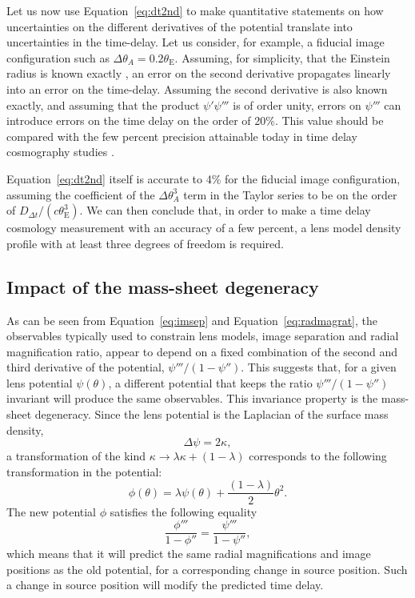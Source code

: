 \documentclass[usenatbib]{mnras}
\def\psii{\psi'}
\def\psiii{\psi''}
\def\psiiii{\psi'''}
\def\tein{\theta_{\mathrm{E}}}
\def\Eref#1{Equation~\ref{#1}\xspace}
\begin{document}
Let us now use \Eref{eq:dt2nd} to make quantitative statements on how uncertainties on the different derivatives of the potential translate into uncertainties in the time-delay.
Let us consider, for example, a fiducial image configuration such as $\Delta\theta_A = 0.2\tein$.
Assuming, for simplicity, that the Einstein radius is known exactly \citep[this is a good approximation, since $\tein$ is typically determined with better than 1\% precision in time-delay lens studies][]{Suy++14, Won++17}, an error on the second derivative propagates linearly into an error on the time-delay. Assuming the second derivative is also known exactly, and assuming that the product $\psii\psiiii$ is of order unity, errors on $\psiiii$ can introduce errors on the time delay on the order of 20\%.
This value should be compared with the few percent precision attainable today in time delay cosmography studies \citep{Suy++17}.

\Eref{eq:dt2nd} itself is accurate to 4\% for the fiducial image configuration, assuming the coefficient of the $\Delta\theta_A^3$ term in the Taylor series to be on the order of $D_{\Delta t}/(c\tein^3)$.
We can then conclude that, in order to make a time delay cosmology measurement with an accuracy of a few percent, a lens model density profile with at least three degrees of freedom is required.

\subsection{Impact of the mass-sheet degeneracy}\label{ssec:msd}

As can be seen from \Eref{eq:imsep} and \Eref{eq:radmagrat}, 
the observables typically used to constrain lens models, image separation and radial magnification ratio, appear to depend on a fixed combination of the second and third derivative of the potential, $\psiiii/(1-\psiii)$.
This suggests that, for a given lens potential $\psi(\theta)$, a different potential that keeps the ratio $\psiiii/(1-\psiii)$ invariant will produce the same observables.
This invariance property is the mass-sheet degeneracy. Since the lens potential is the Laplacian of the surface mass density,
\begin{equation}
\Delta\psi = 2\kappa,
\end{equation}
a transformation of the kind $\kappa \rightarrow \lambda\kappa + (1-\lambda)$ corresponds to the following transformation in the potential:
\begin{equation}\label{eq:pottransform}
\phi(\theta) = \lambda\psi(\theta) + \frac{(1-\lambda)}{2}\theta^2.
\end{equation}
The new potential $\phi$ satisfies the following equality
\begin{equation}\label{eq:mymst}
\frac{\phi'''}{1-\phi''} = \frac{\psiiii}{1-\psiii},
\end{equation}
which means that it will predict the same radial magnifications and image positions as the old potential, for a corresponding change in source position. Such a change in source position will modify the predicted time delay.
\end{document}
